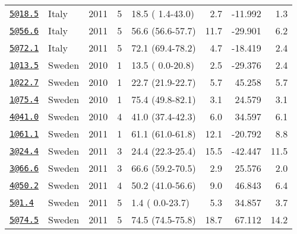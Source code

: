 \documentclass[]{article}
\begin{document}
\begin{longtable}[]{@{}llrrlrrr@{}}
\href{mailto:5@18.5}{\nolinkurl{5@18.5}} & Italy & 2011 & 5 & 18.5 ( 1.4-43.0) & 2.7 & -11.992 & 1.3\tabularnewline
\href{mailto:5@56.6}{\nolinkurl{5@56.6}} & Italy & 2011 & 5 & 56.6 (56.6-57.7) & 11.7 & -29.901 & 6.2\tabularnewline
\href{mailto:5@72.1}{\nolinkurl{5@72.1}} & Italy & 2011 & 5 & 72.1 (69.4-78.2) & 4.7 & -18.419 & 2.4\tabularnewline
\href{mailto:1@13.5}{\nolinkurl{1@13.5}} & Sweden & 2010 & 1 & 13.5 ( 0.0-20.8) & 2.5 & -29.376 & 2.4\tabularnewline
\href{mailto:1@22.7}{\nolinkurl{1@22.7}} & Sweden & 2010 & 1 & 22.7 (21.9-22.7) & 5.7 & 45.258 & 5.7\tabularnewline
\href{mailto:1@75.4}{\nolinkurl{1@75.4}} & Sweden & 2010 & 1 & 75.4 (49.8-82.1) & 3.1 & 24.579 & 3.1\tabularnewline
\href{mailto:4@41.0}{\nolinkurl{4@41.0}} & Sweden & 2010 & 4 & 41.0 (37.4-42.3) & 6.0 & 34.597 & 6.1\tabularnewline
\href{mailto:1@61.1}{\nolinkurl{1@61.1}} & Sweden & 2011 & 1 & 61.1 (61.0-61.8) & 12.1 & -20.792 & 8.8\tabularnewline
\href{mailto:3@24.4}{\nolinkurl{3@24.4}} & Sweden & 2011 & 3 & 24.4 (22.3-25.4) & 15.5 & -42.447 & 11.5\tabularnewline
\href{mailto:3@66.6}{\nolinkurl{3@66.6}} & Sweden & 2011 & 3 & 66.6 (59.2-70.5) & 2.9 & 25.576 & 2.0\tabularnewline
\href{mailto:4@50.2}{\nolinkurl{4@50.2}} & Sweden & 2011 & 4 & 50.2 (41.0-56.6) & 9.0 & 46.843 & 6.4\tabularnewline
\href{mailto:5@1.4}{\nolinkurl{5@1.4}} & Sweden & 2011 & 5 & 1.4 ( 0.0-23.7) & 5.3 & 34.857 & 3.7\tabularnewline
\href{mailto:5@74.5}{\nolinkurl{5@74.5}} & Sweden & 2011 & 5 & 74.5 (74.5-75.8) & 18.7 & 67.112 & 14.2\tabularnewline
\bottomrule
\end{longtable}

\newpage
\end{document}
